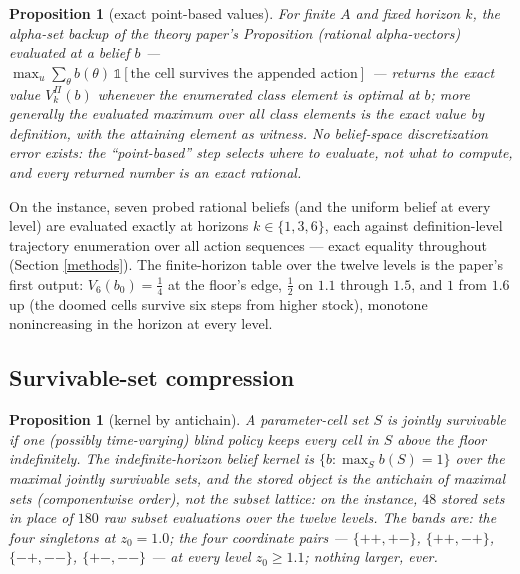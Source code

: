 \documentclass[10pt,twocolumn]{article}
\theoremstyle{plain}
\newtheorem{proposition}[theorem]{Proposition}
\theoremstyle{definition}
\theoremstyle{remark}
\begin{document}
\begin{proposition}[exact point-based values]\label{prop:pbvi}
For finite \(A\) and fixed horizon \(k\), the alpha-set backup of the
theory paper's Proposition (rational alpha-vectors) evaluated at a
belief \(b\) --- \(\max_{u}\sum_{\theta} b(\theta)\,
\mathbb{1}[\text{the cell survives the appended action}]\) --- returns
the exact value \(V^{\Pi}_{k}(b)\) whenever the enumerated class
element is optimal at \(b\); more generally the evaluated maximum over
all class elements is the exact value by definition, with the
attaining element as witness. No belief-space discretization error
exists: the ``point-based'' step selects where to \emph{evaluate}, not
what to compute, and every returned number is an exact rational.
\end{proposition}

On the instance, seven probed rational beliefs (and the uniform belief
at every level) are evaluated exactly at horizons \(k \in \{1, 3,
6\}\), each against definition-level trajectory enumeration over all
action sequences --- exact equality throughout (Section
\ref{methods}). The finite-horizon table over the twelve levels is the
paper's first output: \(V_{6}(b_{0}) = \tfrac14\) at the floor's edge,
\(\tfrac12\) on \(1.1\) through \(1.5\), and \(1\) from \(1.6\) up
(the doomed cells survive six steps from higher stock), monotone
nonincreasing in the horizon at every level.

\subsection{Survivable-set compression}\label{zdd}

\begin{proposition}[kernel by antichain]\label{prop:antichain}
A parameter-cell set \(S\) is \emph{jointly survivable} if one
(possibly time-varying) blind policy keeps every cell in \(S\) above
the floor indefinitely. The indefinite-horizon belief kernel is
\(\{b : \max_{S} b(S) = 1\}\) over the maximal jointly survivable
sets, and the stored object is the antichain of maximal sets
(componentwise order), not the subset lattice: on the instance,
\(48\) stored sets in place of \(180\) raw subset evaluations over the
twelve levels. The bands are: the four singletons at \(z_{0} = 1.0\);
the four \emph{coordinate pairs} --- \(\{++,
+-\}\), \(\{++,
-+\}\), \(\{-+,
--\}\), \(\{+-,
--\}\) --- at every level \(z_{0} \ge 1.1\); nothing larger, ever.
\end{proposition}
\end{document}
